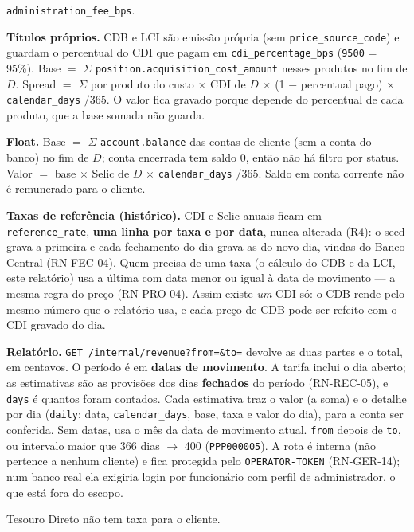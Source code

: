 \documentclass[11pt,a4paper]{article}
\newcommand{\dec}{\textbf{[DEC]}}          %
\newcommand{\tb}[1]{\texttt{#1}}           %
\begin{document}
\begin{regras}
  \tb{administration_fee_bps}.
  \item[RN-REC-06 \dec] \textbf{Títulos próprios.} CDB e LCI são emissão própria (sem
  \tb{price_source_code}) e guardam o percentual do CDI que pagam em \tb{cdi_percentage_bps}
  (\tb{9500} = 95\%). Base $=$ $\Sigma$ \tb{position.acquisition_cost_amount} nesses produtos no fim de
  $D$. Spread $=$ $\Sigma$ por produto do custo $\times$ CDI de $D$ $\times$ (1 $-$ percentual pago)
  $\times$ \tb{calendar_days} $/ 365$. O valor fica gravado porque depende do percentual de cada
  produto, que a base somada não guarda.
  \item[RN-REC-07 \dec] \textbf{Float.} Base $=$ $\Sigma$ \tb{account.balance} das contas de cliente
  (sem a conta do banco) no fim de $D$; conta encerrada tem saldo 0, então não há filtro por status.
  Valor $=$ base $\times$ Selic de $D$ $\times$ \tb{calendar_days} $/ 365$. Saldo em conta corrente
  não é remunerado para o cliente.
  \item[RN-REC-08 \dec] \textbf{Taxas de referência (histórico).} CDI e Selic anuais ficam em
  \tb{reference_rate}, \textbf{uma linha por taxa e por data}, nunca alterada (R4): o seed grava a
  primeira e cada fechamento do dia grava as do novo dia, vindas do Banco Central (RN-FEC-04).
  Quem precisa de uma taxa (o cálculo do CDB e da LCI, este relatório) usa a última com data menor
  ou igual à data de movimento --- a mesma regra do preço (RN-PRO-04). Assim existe \emph{um} CDI
  só: o CDB rende pelo mesmo número que o relatório usa, e cada preço de CDB pode ser refeito com
  o CDI gravado do dia.
  \item[RN-REC-09 \dec] \textbf{Relatório.} \tb{GET /internal/revenue?from=\&to=} devolve as
  duas partes e o total, em centavos. O período é em \textbf{datas de movimento}. A tarifa inclui o
  dia aberto; as estimativas são as provisões dos dias \textbf{fechados} do período (RN-REC-05), e
  \tb{days} é quantos foram contados. Cada estimativa traz o valor (a soma) e o detalhe por dia
  (\tb{daily}: data, \tb{calendar_days}, base, taxa e valor do dia), para a conta ser conferida.
  Sem datas, usa o mês da data de movimento atual. \tb{from} depois de \tb{to}, ou
  intervalo maior que 366 dias $\to$ 400 (\tb{PPP000005}). A rota é interna (não pertence a
  nenhum cliente) e fica protegida pelo \tb{OPERATOR-TOKEN} (RN-GER-14); num banco real ela
  exigiria login por funcionário com perfil de administrador, o que está fora do escopo.
  \item[RN-REC-10 \dec] Tesouro Direto não tem taxa para o cliente.
\end{regras}
\end{document}

